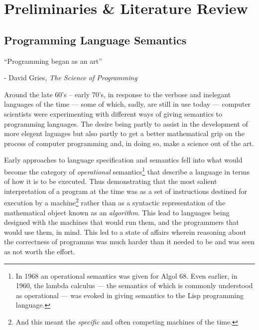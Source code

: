 \documentclass[oneside,12pt]{article}
\begin{document}
\pagebreak
  
\tableofcontents

\pagebreak

\raggedbottom

\section{Preliminaries \& Literature Review}




\subsection{Programming Language Semantics}

\epigraph{``Programming began as an art''}{ \tiny - David Gries, \emph{The Science of Programming}}


Around the late 60's -- early 70's, in response to the verbose and inelegant languages of the time --- some of which, sadly, are still in use today --- computer scientists were experimenting with different ways of giving semantics to programming languages. The desire being partly to assist in the development of more elegent laguages but also partly to get a better mathematical grip on the process of computer programming and, in doing so, make a science out of the art.


Early approaches to language specification and semantics fell into what would become the category of \emph{operational} semantics\footnote{In 1968 an operational semantics was given for Algol 68. Even earlier, in 1960, the lambda calculus --- the semantics of which is commonly understood as operational --- was evoked in giving semantics to the Lisp programming language.}  that describe a language in terms of how it is to be executed. Thus demonstrating that the most salient interpretation of a program at the time was as a set of instructions destined for execution by a machine\footnote{And this meant the \emph{specific} and often competing machines of the time.} rather than as a syntactic representation of the mathematical \mbox{object} known as an \emph{algorithm}. This lead to languages being designed with the machines that would run them, and the programmers that would use them, in mind. This led to a state of affairs wherein reasoning about the correctness of programms was much harder than it needed to be and was seen as not worth the effort.
\end{document}
